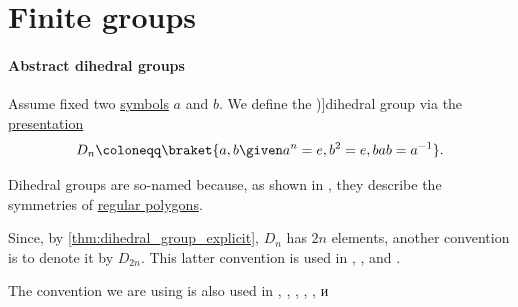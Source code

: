 \section{Finite groups}\label{sec:finite_groups}

\paragraph{Abstract dihedral groups}

\begin{definition}\label{def:dihedral_group}
  Assume fixed two \hyperref[def:formal_language/symbol]{symbols} \( a \) and \( b \). We define the \term[ru=группа диедра (\cite[161]{Винберг2014КурсАлгебры})]{dihedral group} via the \hyperref[def:group_presentation]{presentation}
  \begin{equation}\label{eq:def:dihedral_group}
    D_n \coloneqq \braket{ a, b \given a^n = e, b^2 = e, bab = a^{-1} }.
  \end{equation}
\end{definition}
\begin{comments}
  \item Dihedral groups are so-named because, as shown in , they describe the symmetries of \hyperref[def:regular_polygon]{regular polygons}.

  \item Since, by \cref{thm:dihedral_group_explicit}, \( D_n \) has \( 2n \) elements, another convention is to denote it by \( D_{2n} \). This latter convention is used in
  \cite[exerc. 1.1.34(a)]{Lang2002Algebra},
  \cite[2]{Berger1987GeometryI},
  \cite[52]{Aluffi2009Algebra} and
  \cite[136]{Rotman2015AdvancedModernAlgebraPart1}.

  The convention we are using is also used in
  \cite[34]{Jacobson1985BasicAlgebraI},
  \cite[148]{Bourbaki1998Algebra1to3},
  \cite[121]{Knapp2006BasicAlgebra},
  \cite[example 8.2.3]{Steinberg2012RepresentationTheory},
  \cite[230]{Aigner1997CombinatorialTheory},
  \cite[example 4.1.11]{Винберг2014КурсАлгебры} и
  \cite[149]{Шафаревич2019ОсновныеПонятияАлгебры}
\end{comments}

